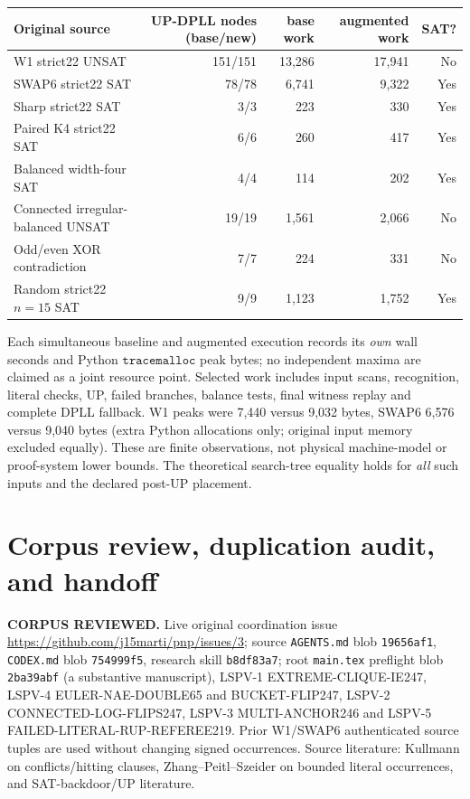 \documentclass[10pt]{article}
\begin{document}
\begin{center}\begin{tabular}{lrrrr}
\toprule
Original source & UP-DPLL nodes (base/new) & base work & augmented work & SAT?\\
\midrule
W1 strict22 UNSAT &151/151&13,286&17,941&No\\
SWAP6 strict22 SAT &78/78&6,741&9,322&Yes\\
Sharp strict22 SAT &3/3&223&330&Yes\\
Paired K4 strict22 SAT &6/6&260&417&Yes\\
Balanced width-four SAT &4/4&114&202&Yes\\
Connected irregular-balanced UNSAT &19/19&1,561&2,066&No\\
Odd/even XOR contradiction &7/7&224&331&No\\
Random strict22 $n=15$ SAT &9/9&1,123&1,752&Yes\\
\bottomrule
\end{tabular}\end{center}
Each simultaneous baseline and augmented execution records its \emph{own} wall seconds and Python $\texttt{tracemalloc}$ peak bytes; no independent maxima are claimed as a joint resource point. Selected work includes input scans, recognition, literal checks, UP, failed branches, balance tests, final witness replay and complete DPLL fallback. W1 peaks were 7,440 versus 9,032 bytes, SWAP6 6,576 versus 9,040 bytes (extra Python allocations only; original input memory excluded equally). These are finite observations, not physical machine-model or proof-system lower bounds. The theoretical search-tree equality holds for \emph{all} such inputs and the declared post-UP placement.

\section{Corpus review, duplication audit, and handoff}
\noindent\textbf{CORPUS REVIEWED.} Live original coordination issue \url{https://github.com/j15marti/pnp/issues/3}; source \texttt{AGENTS.md} blob \texttt{19656af1}, \texttt{CODEX.md} blob \texttt{754999f5}, research skill \texttt{b8df83a7}; root \texttt{main.tex} preflight blob \texttt{2ba39abf} (a substantive manuscript), LSPV-1 EXTREME-CLIQUE-IE247, LSPV-4 EULER-NAE-DOUBLE65 and BUCKET-FLIP247, LSPV-2 CONNECTED-LOG-FLIPS247, LSPV-3 MULTI-ANCHOR246 and LSPV-5 FAILED-LITERAL-RUP-REFEREE219. Prior W1/SWAP6 authenticated source tuples are used without changing signed occurrences. Source literature: Kullmann on conflicts/hitting clauses, Zhang--Peitl--Szeider on bounded literal occurrences, and SAT-backdoor/UP literature.
\end{document}
